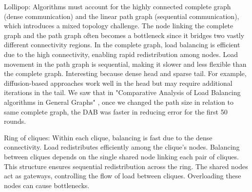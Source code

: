 Lollipop: Algorithms must account for the highly connected complete graph (dense communication) and the linear path graph (sequential communication), which introduces a mixed topology challenge. The node linking the complete graph and the path graph often becomes a bottleneck since it bridges two vastly different connectivity regions. In the complete graph, load balancing is efficient due to the high connectivity, enabling rapid redistribution among nodes. Load movement in the path graph is sequential, making it slower and less flexible than the complete graph. Interesting because dense head and sparse tail.  For example, diffusion-based approaches work well in the head but may require additional iterations in the tail. We saw that in "Comparative Analysis of Load Balancing algorithms in General Graphs" \cite{Bayazitoglu}, once we changed the path size in relation to same complete graph, the DAB was faster in reducing error for the first 50 rounds. 

Ring of cliques: Within each clique, balancing is fast due to the dense connectivity. Load redistributes efficiently among the clique's nodes. Balancing between cliques depends on the single shared node linking each pair of cliques. This structure ensures sequential redistribution across the ring. The shared nodes act as gateways, controlling the flow of load between cliques. Overloading these nodes can cause bottlenecks.